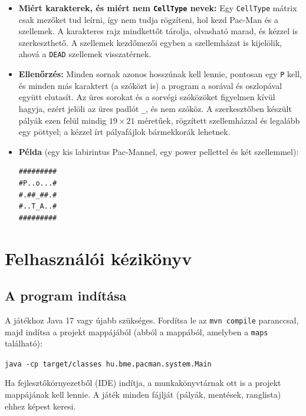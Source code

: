 \documentclass[11pt, a4paper]{article}
\begin{document}
\begin{itemize}
    \item \textbf{Miért karakterek, és miért nem \texttt{CellType} nevek:} Egy \texttt{CellType} mátrix csak mezőket tud leírni, így nem tudja rögzíteni, hol kezd Pac-Man és a szellemek. A karakteres rajz mindkettőt tárolja, olvasható marad, és kézzel is szerkeszthető. A szellemek kezdőmezői egyben a szellemházat is kijelölik, ahová a \texttt{DEAD} szellemek visszatérnek.
    \item \textbf{Ellenőrzés:} Minden sornak azonos hosszúnak kell lennie, pontosan egy \texttt{P} kell, és minden más karaktert (a szóközt is) a program a sorával és oszlopával együtt elutasít. Az üres sorokat és a sorvégi szóközöket figyelmen kívül hagyja, ezért jelöli az üres padlót \texttt{\_}, és nem szóköz. A szerkesztőben készült pályák ezen felül mindig $19 \times 21$ méretűek, rögzített szellemházzal és legalább egy pöttyel; a kézzel írt pályafájlok bármekkorák lehetnek.
    \item \textbf{Példa} (egy kis labirintus Pac-Mannel, egy power pellettel és két szellemmel):

    \vspace{0.1cm}
\begin{verbatim}
#########
#P..o...#
#.##_##.#
#..T_A..#
#########
\end{verbatim}
\end{itemize}

\clearpage

\section{Felhasználói kézikönyv}
\label{sec:manual}

\subsection*{A program indítása}
A játékhoz Java 17 vagy újabb szükséges. Fordítsa le az \texttt{mvn compile} paranccsal, majd indítsa a projekt mappájából (abból a mappából, amelyben a \texttt{maps} található):

\vspace{0.1cm}
\texttt{java -cp target/classes hu.bme.pacman.system.Main}
\vspace{0.1cm}

Ha fejlesztőkörnyezetből (IDE) indítja, a munkakönyvtárnak ott is a projekt mappájának kell lennie. A játék minden fájlját (pályák, mentések, ranglista) ehhez képest keresi.
\end{document}
